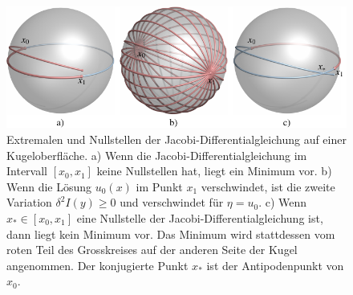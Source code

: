 %
%
%
\begin{figure}
\centering
\includegraphics{chapters/060-variation2/images/jacobi.pdf}
\caption{Extremalen und Nullstellen der Jacobi-Differentialgleichung
auf einer Kugeloberfläche.
a) Wenn die Jacobi-Differentialgleichung im Intervall $[x_0,x_1]$ keine
Nullstellen hat, liegt ein Minimum vor.
b) Wenn die Lösung $u_0(x)$ im Punkt $x_1$ verschwindet, ist die
zweite Variation $\delta^2 I(y)\ge 0$ und verschwindet für $\eta = u_0$.
c) Wenn $x_*\in[x_0,x_1]$ eine Nullstelle der Jacobi-Differentialgleichung
ist, dann liegt kein Minimum vor.
Das Minimum wird stattdessen vom roten Teil des Grosskreises auf der anderen
Seite der Kugel angenommen.
Der konjugierte Punkt $x_*$ ist der Antipodenpunkt von $x_0$.
\label{buch:variation2:fig:jacobi}}
\end{figure}

